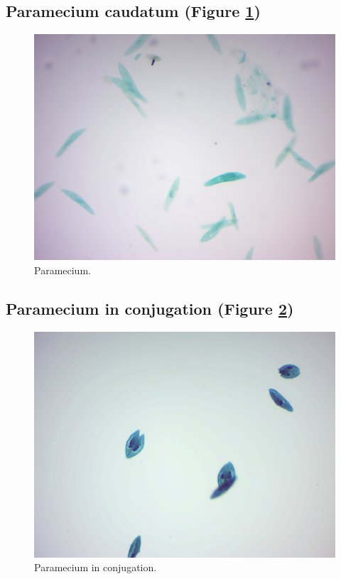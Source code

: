\subsection{Paramecium caudatum (Figure
\ref{fig:parameciumprepared})}\label{paramecium-caudatum-figure-reffigparameciumprepared}

\begin{figure}

{\centering \includegraphics[width=0.7\linewidth]{./figures/protists/Paramecium_prepared} 

}

\caption{Paramecium.}\label{fig:parameciumprepared}
\end{figure}

\subsection{Paramecium in conjugation (Figure
\ref{fig:conjugation})}\label{paramecium-in-conjugation-figure-reffigconjugation}

\begin{figure}

{\centering \includegraphics[width=0.7\linewidth]{./figures/protists/paramecium_conjugation} 

}

\caption{Paramecium in conjugation.}\label{fig:conjugation}
\end{figure}

